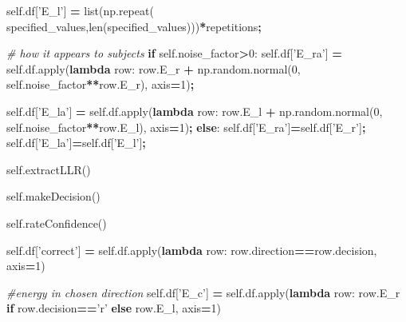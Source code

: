 \documentclass[12pt,twoside]{reedthesis}
\newenvironment{Shaded}{\begin{snugshade}}{\end{snugshade}}
\newcommand{\BuiltInTok}[1]{#1}
\newcommand{\CommentTok}[1]{\textcolor[rgb]{0.56,0.35,0.01}{\textit{#1}}}
\newcommand{\ControlFlowTok}[1]{\textcolor[rgb]{0.13,0.29,0.53}{\textbf{#1}}}
\newcommand{\DecValTok}[1]{\textcolor[rgb]{0.00,0.00,0.81}{#1}}
\newcommand{\KeywordTok}[1]{\textcolor[rgb]{0.13,0.29,0.53}{\textbf{#1}}}
\newcommand{\NormalTok}[1]{#1}
\newcommand{\OperatorTok}[1]{\textcolor[rgb]{0.81,0.36,0.00}{\textbf{#1}}}
\newcommand{\StringTok}[1]{\textcolor[rgb]{0.31,0.60,0.02}{#1}}
\newcommand{\VariableTok}[1]{\textcolor[rgb]{0.00,0.00,0.00}{#1}}
\begin{document}
\begin{Shaded}
\begin{Highlighting}[]
        \VariableTok{self}\NormalTok{.df[}\StringTok{'E_l'}\NormalTok{] }\OperatorTok{=} \BuiltInTok{list}\NormalTok{(np.repeat(}
\NormalTok{            specified_values,}\BuiltInTok{len}\NormalTok{(specified_values)))}\OperatorTok{*}\NormalTok{repetitions}\OperatorTok{;}
        
        \CommentTok{# how it appears to subjects}
        \ControlFlowTok{if} \VariableTok{self}\NormalTok{.noise_factor}\OperatorTok{>}\DecValTok{0}\NormalTok{:}
          \VariableTok{self}\NormalTok{.df[}\StringTok{'E_ra'}\NormalTok{] }\OperatorTok{=} \VariableTok{self}\NormalTok{.df.}\BuiltInTok{apply}\NormalTok{(}\KeywordTok{lambda}\NormalTok{ row: row.E_r }\OperatorTok{+}
\NormalTok{                 np.random.normal(}\DecValTok{0}\NormalTok{, }\VariableTok{self}\NormalTok{.noise_factor}\OperatorTok{**}\NormalTok{row.E_r), }
\NormalTok{                 axis}\OperatorTok{=}\DecValTok{1}\NormalTok{)}\OperatorTok{;}

          \VariableTok{self}\NormalTok{.df[}\StringTok{'E_la'}\NormalTok{] }\OperatorTok{=} \VariableTok{self}\NormalTok{.df.}\BuiltInTok{apply}\NormalTok{(}\KeywordTok{lambda}\NormalTok{ row: row.E_l }\OperatorTok{+}
\NormalTok{                 np.random.normal(}\DecValTok{0}\NormalTok{, }\VariableTok{self}\NormalTok{.noise_factor}\OperatorTok{**}\NormalTok{row.E_l), }
\NormalTok{                 axis}\OperatorTok{=}\DecValTok{1}\NormalTok{)}\OperatorTok{;}
        \ControlFlowTok{else}\NormalTok{:}
          \VariableTok{self}\NormalTok{.df[}\StringTok{'E_ra'}\NormalTok{]}\OperatorTok{=}\VariableTok{self}\NormalTok{.df[}\StringTok{'E_r'}\NormalTok{]}\OperatorTok{;}
          \VariableTok{self}\NormalTok{.df[}\StringTok{'E_la'}\NormalTok{]}\OperatorTok{=}\VariableTok{self}\NormalTok{.df[}\StringTok{'E_l'}\NormalTok{]}\OperatorTok{;}

        \VariableTok{self}\NormalTok{.extractLLR()}

        \VariableTok{self}\NormalTok{.makeDecision()}

        \VariableTok{self}\NormalTok{.rateConfidence()}
        
        \VariableTok{self}\NormalTok{.df[}\StringTok{'correct'}\NormalTok{] }\OperatorTok{=} \VariableTok{self}\NormalTok{.df.}\BuiltInTok{apply}\NormalTok{(}\KeywordTok{lambda}\NormalTok{ row: }
\NormalTok{               row.direction}\OperatorTok{==}\NormalTok{row.decision, axis}\OperatorTok{=}\DecValTok{1}\NormalTok{)}
        
        \CommentTok{#energy in chosen direction}
        \VariableTok{self}\NormalTok{.df[}\StringTok{'E_c'}\NormalTok{] }\OperatorTok{=} \VariableTok{self}\NormalTok{.df.}\BuiltInTok{apply}\NormalTok{(}\KeywordTok{lambda}\NormalTok{ row: }
\NormalTok{                                       row.E_r }\ControlFlowTok{if}\NormalTok{ row.decision}\OperatorTok{==}\StringTok{'r'} 
                                       \ControlFlowTok{else}\NormalTok{ row.E_l, axis}\OperatorTok{=}\DecValTok{1}\NormalTok{)}
        

\end{Highlighting}
\end{Shaded}
\end{document}
